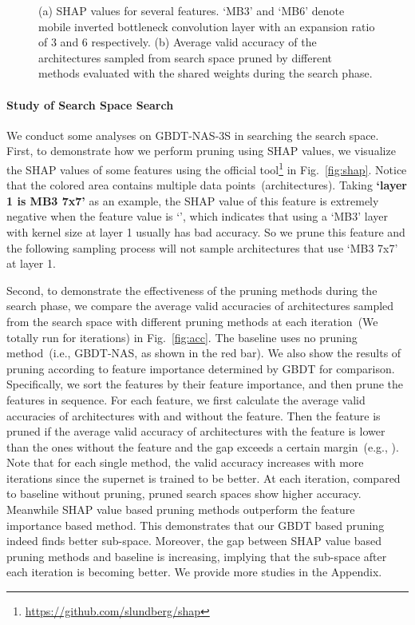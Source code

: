 \documentclass{article}
\begin{document}
\begin{figure}[htbp]
\centering
{}
\caption{(a) SHAP values for several features. `MB3' and `MB6' denote mobile inverted bottleneck convolution layer with an expansion ratio of 3 and 6 respectively. (b) Average valid accuracy of the architectures sampled from search space pruned by different methods evaluated with the shared weights during the search phase.}
\label{fig:studysss}
\end{figure}

\paragraph{Study of Search Space Search}
We conduct some analyses on GBDT-NAS-3S in searching the search space. First, to demonstrate how we perform pruning using SHAP values, we visualize the SHAP values of some features using the official tool\footnote{\url{https://github.com/slundberg/shap}} in Fig.~\ref{fig:shap}. Notice that the colored area contains multiple data points~(architectures). Taking \textbf{`layer 1 is MB3 7x7'} as an example, the SHAP value of this feature is extremely negative when the feature value is `', which indicates that using a `MB3' layer with kernel size  at layer 1 usually has bad accuracy. So we prune this feature and the following sampling process will not sample architectures that use `MB3 7x7' at layer 1. 

Second, to demonstrate the effectiveness of the pruning methods during the search phase, we compare the average valid accuracies of architectures sampled from the search space with different pruning methods at each iteration~(We totally run for  iterations) in Fig.~\ref{fig:acc}. The baseline uses no pruning method~(i.e., GBDT-NAS, as shown in the red bar). We also show the results of pruning according to feature importance determined by GBDT for comparison. Specifically, we sort the features by their feature importance, and then prune the features in sequence. For each feature, we first calculate the average valid accuracies of architectures with and without the feature. Then the feature is pruned if the average valid accuracy of architectures with the feature is lower than the ones without the feature and the gap exceeds a certain margin~(e.g., ). Note that for each single method, the valid accuracy increases with more iterations since the supernet is trained to be better. At each iteration, compared to baseline without pruning, pruned search spaces show higher accuracy. Meanwhile SHAP value based pruning methods outperform the feature importance based method. This demonstrates that our GBDT based pruning indeed finds better sub-space. Moreover, the gap between SHAP value based pruning methods and baseline is increasing, implying that the sub-space after each iteration is becoming better. We provide more studies in the Appendix.
\end{document}
